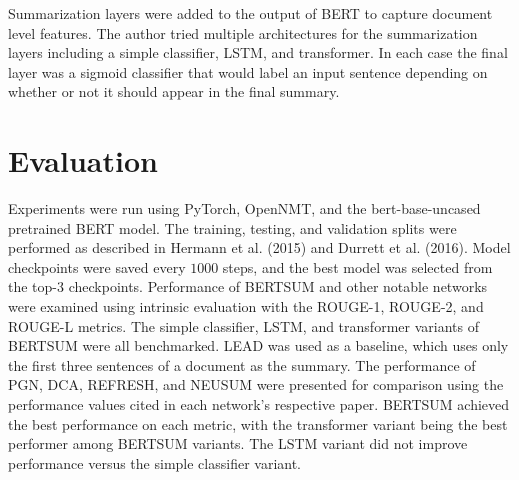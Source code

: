 \documentclass[12pt]{article}
\begin{document}
Summarization layers were added to the output of BERT to capture
document level features. The author tried multiple architectures for
the summarization layers including a simple classifier, LSTM, and
transformer. In each case the final layer was a sigmoid classifier
that would label an input sentence depending on whether or not it
should appear in the final summary.

\section{Evaluation}

Experiments were run using PyTorch, OpenNMT, and the bert-base-uncased
pretrained BERT model. The training, testing, and validation splits
were performed as described in Hermann et al. (2015) and Durrett et
al. (2016). Model checkpoints were saved every $1000$ steps, and the
best model was selected from the top-3 checkpoints.  Performance of
BERTSUM and other notable networks were examined using intrinsic
evaluation with the ROUGE-1, ROUGE-2, and ROUGE-L metrics. The simple
classifier, LSTM, and transformer variants of BERTSUM were all
benchmarked. LEAD was used as a baseline, which uses only the first
three sentences of a document as the summary. The performance of PGN,
DCA, REFRESH, and NEUSUM were presented for comparison using the
performance values cited in each network's respective paper. BERTSUM
achieved the best performance on each metric, with the transformer
variant being the best performer among BERTSUM variants. The LSTM
variant did not improve performance versus the simple classifier
variant.
\end{document}
